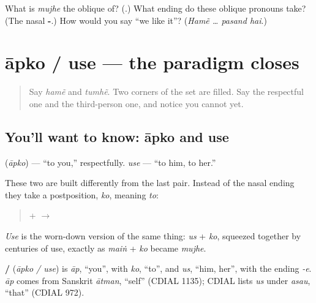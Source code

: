 \begin{tcolorbox}[breakable,colback=teal!4,colframe=teal!35!black,title={Before you move on}]
What is \emph{mujhe} the oblique of? (\textbf{}.) What ending do these oblique pronouns take? (The nasal \textbf{-}.) How would you say \textquotedblleft{}we like it\textquotedblright{}? (\emph{Hamẽ … pasand hai}.)
\end{tcolorbox}
\section[\texorpdfstring{\hi{आपको} / \hi{उसे} (āpko / use)}{आपको / उसे (āpko / use)}]{āpko / use — the paradigm closes}

\label{lesson:HI-C86-aapko-use}



\begin{quote}
Say \emph{hamẽ} and \emph{tumhẽ}. Two corners of the set are filled. Say the respectful one and the third-person one, and notice you cannot yet.
\end{quote}

\subsection*{You'll want to know: āpko and use}
\textbf{} (\emph{āpko}) — \textquotedblleft{}to you,\textquotedblright{} respectfully. \emph{use} — \textquotedblleft{}to him, to her.\textquotedblright{}

These two are built differently from the last pair. Instead of the nasal ending they take a postposition, \emph{ko}, meaning \emph{to}:

\begin{quote}
\textbf{} + \textbf{} $\to$ \textbf{}
\end{quote}

\emph{Use} is the worn-down version of the same thing: \emph{us} + \emph{ko}, squeezed together by centuries of use, exactly as \emph{maiṅ} + \emph{ko} became \emph{mujhe}.

\begin{cousinweb}
\textbf{ / } (\emph{āpko / use}) is \emph{āp}, \textquotedblleft{}you\textquotedblright{}, with \emph{ko}, \textquotedblleft{}to\textquotedblright{}, and \emph{us}, \textquotedblleft{}him, her\textquotedblright{}, with the ending \emph{-e}. \emph{āp} comes from Sanskrit \emph{ātman}, \textquotedblleft{}self\textquotedblright{} (CDIAL 1135); CDIAL lists \emph{us} under \emph{asau}, \textquotedblleft{}that\textquotedblright{} (CDIAL 972).
\end{cousinweb}

